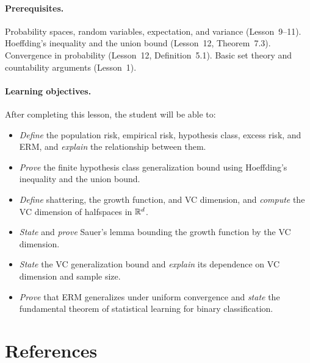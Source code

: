 \documentclass[11pt,a4paper]{article}
\begin{document}
\paragraph{Prerequisites.}
Probability spaces, random variables, expectation, and variance (Lesson~9--11).
Hoeffding's inequality and the union bound (Lesson~12, Theorem~7.3).
Convergence in probability (Lesson~12, Definition~5.1).
Basic set theory and countability arguments (Lesson~1).

\paragraph{Learning objectives.}
After completing this lesson, the student will be able to:
\begin{itemize}
    \item \emph{Define} the population risk, empirical risk, hypothesis
    class, excess risk, and ERM, and \emph{explain} the relationship
    between them.
    \item \emph{Prove} the finite hypothesis class generalization bound
    using Hoeffding's inequality and the union bound.
    \item \emph{Define} shattering, the growth function, and VC dimension,
    and \emph{compute} the VC dimension of halfspaces in $\mathbb{R}^d$.
    \item \emph{State} and \emph{prove} Sauer's lemma bounding the growth
    function by the VC dimension.
    \item \emph{State} the VC generalization bound and \emph{explain} its
    dependence on VC dimension and sample size.
    \item \emph{Prove} that ERM generalizes under uniform convergence and
    \emph{state} the fundamental theorem of statistical learning for
    binary classification.
\end{itemize}


\section{References}
\label{sec:references}
\end{document}
